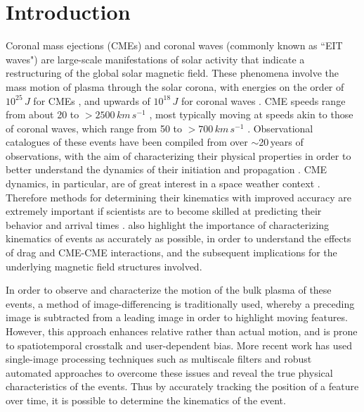 \documentclass[structabstract]{aa}
\begin{document}
\maketitle

%

\section{Introduction}
\label{sect_intro}

Coronal mass ejections (CMEs) and coronal waves (commonly known as ``EIT waves") are large-scale manifestations of solar activity that indicate a restructuring of the global solar magnetic field. These phenomena involve the mass motion of plasma through the solar corona, with energies on the order of $10^{25}\,J$ for CMEs \citep{2004JGRA..10910104E}, and upwards of $10^{18}\,J$ for coronal waves \citep{2005ApJ...633L.145B}. CME speeds range from about 20 to $>2500\,km\,s^{-1}$ \citep{2004JGRA..10907105Y}, most typically moving at speeds akin to those of coronal waves, which range from 50 to $>700\,km\,s^{-1}$ \citep{2009ApJS..183..225T}. Observational catalogues of these events have been compiled from over $\sim$20\,years of observations, with the aim of characterizing their physical properties in order to better understand the dynamics of their initiation and propagation \citep[see some recent reviews by][]{2011SSRv..158..365G,2012SoPh..tmp...93P,2011ASSL..376.....H,2012LRSP....9....3W}. CME dynamics, in particular, are of great interest in a space weather context \citep[e.g.,][]{SWE:SWE493, 2010heliophysics, 2005A&A...440..373H}. Therefore methods for determining their kinematics with improved accuracy are extremely important if scientists are to become skilled at predicting their behavior and arrival times \citep[see, for example, efforts by][]{2010NatCo...1E..74B, 2005AnGeo..23.1033S, 2004Natur.432...78P}. \citet{2012ApJ...749...57T} also highlight the importance of characterizing kinematics of events as accurately as possible, in order to understand the effects of drag and CME-CME interactions, and the subsequent implications for the underlying magnetic field structures involved.

In order to observe and characterize the motion of the bulk plasma of these events, a method of image-differencing is traditionally used, whereby a preceding image is subtracted from a leading image in order to highlight moving features. However, this approach enhances relative rather than actual motion, and is prone to spatiotemporal crosstalk and user-dependent bias. More recent work has used single-image processing techniques such as multiscale filters \citep{2011AdSpR..47.2118G, 2009A&A...495..325B, 2008SoPh..248..457Y} and robust automated approaches \citep[e.g.,][]{2012ApJ...752..145B, 2012SoPh..276..479P, 2011A&A...531A..42L} to overcome these issues and reveal the true physical characteristics of the events. Thus by accurately tracking the position of a feature over time, it is possible to determine the kinematics of the event. 
\end{document}
